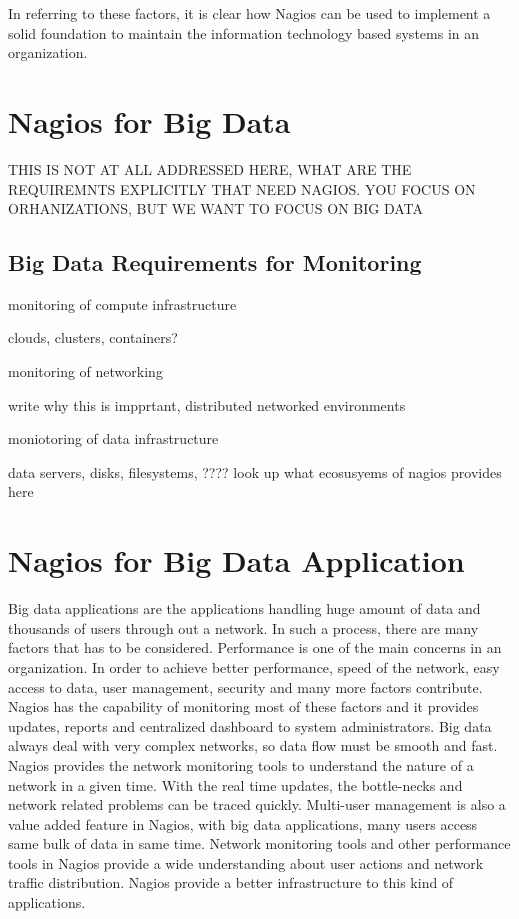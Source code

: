 \documentclass[9pt,twocolumn,twoside]{styles/osajnl}
\begin{document}
In referring to these factors, it is clear how Nagios can be used to
implement a solid foundation to maintain the information technology
based systems in an organization.

\section{Nagios for Big Data}

THIS IS NOT AT ALL ADDRESSED HERE, WHAT ARE THE REQUIREMNTS EXPLICITLY
THAT NEED NAGIOS. YOU FOCUS ON ORHANIZATIONS, BUT WE WANT TO FOCUS ON
BIG DATA

\subsection{Big Data Requirements for Monitoring}

monitoring of compute infrastructure

   clouds, clusters, containers?

monitoring of networking 

    write why this is impprtant, distributed networked environments

moniotoring of data infrastructure

   data servers, disks, filesystems, ???? look up what ecosusyems of
   nagios provides here


\section{Nagios for Big Data Application}

Big data applications are the applications handling huge amount of
data and thousands of users through out a network. In such a process,
there are many factors that has to be considered. Performance is
one of the main concerns in an organization. In order to achieve better
performance, speed of the network, easy access to data, user management,
security and many more factors contribute. Nagios has the capability of
monitoring most of these factors and it provides updates, reports and
centralized dashboard to system administrators. Big data always
deal with very complex networks, so data flow must be smooth and fast.
Nagios provides the network monitoring tools to understand the nature
of a network in a given time. With the real time updates, the bottle-necks
and network related problems can be traced quickly. Multi-user management
is also a value added feature in Nagios, with big data applications, many
users access same bulk of data in same time. Network monitoring tools and
other performance tools in Nagios provide a wide understanding about user
actions and network traffic distribution. Nagios provide a better infrastructure
to this kind of applications. 
\end{document}
